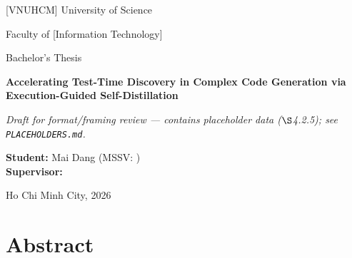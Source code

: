 \documentclass[12pt,a4paper]{report}
\begin{document}
\begin{titlepage}
\centering
{\large [VNUHCM] University of Science\par}     %
{\large Faculty of [Information Technology]\par} %
\vspace{1.5cm}
{\large Bachelor's Thesis\par}
\vspace{2cm}
{\Large\bfseries Accelerating Test-Time Discovery in Complex Code Generation via Execution-Guided Self-Distillation\par}
\vspace{1cm}
{\color{red}\small\itshape Draft for format/framing review --- contains placeholder data ($\S$4.2.5); see \texttt{PLACEHOLDERS.md}.\par}
\vspace{1.5cm}
\begin{flushright}\large
\textbf{Student:} Mai Dang \quad (MSSV: \underline{\hspace{2.5cm}})\\[0.5em]
\textbf{Supervisor:} \underline{\hspace{5cm}}\\[0.5em]   %
\end{flushright}
\vfill
{\large Ho Chi Minh City, 2026\par}              %
\end{titlepage}

\chapter*{Abstract}


\tableofcontents











\appendix

\end{document}
